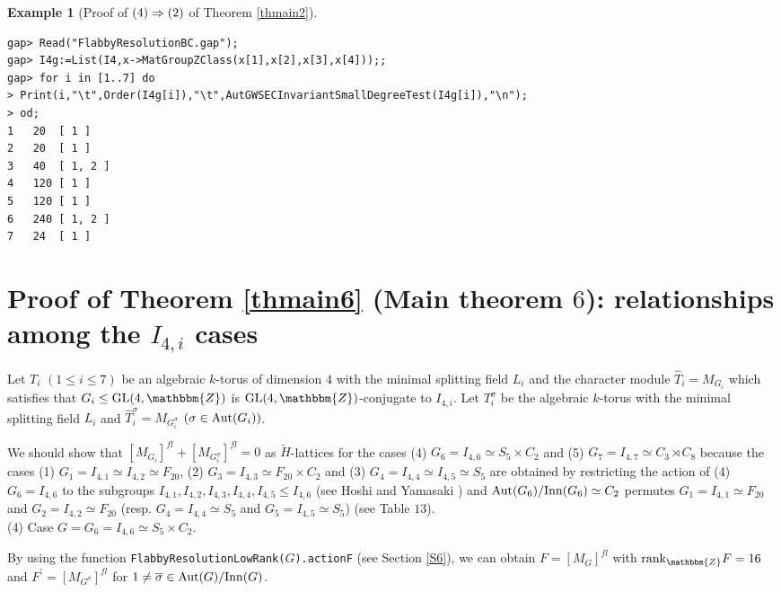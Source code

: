 \documentclass{amsart}
\theoremstyle{plain}
\theoremstyle{definition}
\newtheorem{example}[theorem]{Example}
\theoremstyle{remark}
\newcommand{\bZ}{\mathbbm{Z}}\newcommand{\bQ}{\mathbbm{Q}}
\newcommand{\GL}{{\rm GL}}\newcommand{\SL}{{\rm SL}}
\newcounter{sub}\def\tr{\mbox{tr }}
\begin{document}
{\bigskip
\begin{example}[{Proof of ${\rm (4)}\Rightarrow {\rm (2)}$ of {Theorem \ref{thmain2}}}]\label{ex10.3}~\vspace*{-5mm}\\
\begin{verbatim}
gap> Read("FlabbyResolutionBC.gap");
gap> I4g:=List(I4,x->MatGroupZClass(x[1],x[2],x[3],x[4]));;
gap> for i in [1..7] do
> Print(i,"\t",Order(I4g[i]),"\t",AutGWSECInvariantSmallDegreeTest(I4g[i]),"\n");
> od;
1	20	[ 1 ]
2	20	[ 1 ]
3	40	[ 1, 2 ]
4	120	[ 1 ]
5	120	[ 1 ]
6	240	[ 1, 2 ]
7	24	[ 1 ]
\end{verbatim}
\end{example}

\section{Proof of Theorem \ref{thmain6} (Main theorem $6$): relationships among the $I_{4,i}$ cases}\label{S11}

Let $T_i$ $(1\leq i\leq 7)$ be an algebraic $k$-torus of dimension $4$ 
with the minimal splitting field $L_i$ and 
the character module $\widehat{T}_i=M_{G_i}$ which satisfies that 
$G_i\leq \GL(4,\bZ)$ is $\GL(4,\bZ)$-conjugate to $I_{4,i}$. 
Let $T_i^\sigma$ be the algebraic $k$-torus 
with the minimal splitting field $L_i$ and 
$\widehat{T}_i^\sigma=M_{G_i^\sigma}$ $(\sigma\in {\rm Aut}(G_i))$. 

We should show that 
$[M_{G_i}]^{fl}+[M_{G_i^\sigma}]^{fl}=0$ as $\widetilde{H}$-lattices 
for the cases 
(4) $G_6=I_{4,6}\simeq S_5\times C_2$ and 
(5) $G_7=I_{4,7}\simeq C_3\rtimes C_8$ 
because the cases 
(1) $G_1=I_{4,1}\simeq I_{4,2}\simeq F_{20}$, 
(2) $G_3=I_{4,3}\simeq F_{20}\times C_2$ 
and (3) $G_4=I_{4,4}\simeq I_{4,5}\simeq S_5$ 
are obtained by restricting the action of (4) $G_6=I_{4,6}$ 
to the subgroups $I_{4,1}, I_{4,2}, I_{4,3}, I_{4,4}, I_{4,5}\leq I_{4,6}$ 
(see Hoshi and Yamasaki \cite[Lemma 2.17]{HY17}) 
and ${\rm Aut}(G_6)/{\rm Inn}(G_6)\simeq C_2$ 
permutes $G_1=I_{4,1}\simeq F_{20}$ and $G_2=I_{4,2}\simeq F_{20}$
(resp. $G_4=I_{4,4}\simeq S_5$ and $G_5=I_{4,5}\simeq S_5$) 
(see Table $13$).\\

(4) Case $G=G_6=I_{4,6}\simeq S_5\times C_2$. 

By using the function 
{\tt FlabbyResolutionLowRank(}$G${\tt).actionF} (see Section \ref{S6}), 
we can obtain $F=[M_G]^{fl}$ with ${\rm rank}_\bZ F=16$ 
and $F^\prime=[M_{G^\sigma}]^{fl}$ for 
$1\neq\overline{\sigma}\in {\rm Aut}(G)/{\rm Inn}(G)$. 

}
\end{document}
